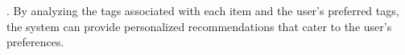 . By analyzing the tags associated with each item and the user's preferred tags, the system can provide personalized recommendations that cater to the user's preferences.